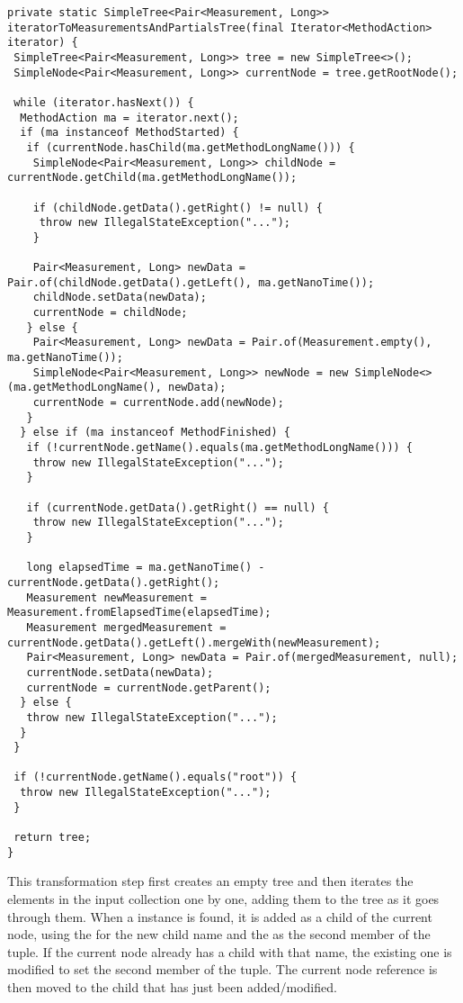 \noindent\begin{minipage}[c]{\linewidth}
\begin{lstlisting}[breaklines,caption={First transformation step},label=lis:timerecorderimplementation:iteratortomeasurementsandpartialstree]
private static SimpleTree<Pair<Measurement, Long>> iteratorToMeasurementsAndPartialsTree(final Iterator<MethodAction> iterator) {
 SimpleTree<Pair<Measurement, Long>> tree = new SimpleTree<>();
 SimpleNode<Pair<Measurement, Long>> currentNode = tree.getRootNode();

 while (iterator.hasNext()) {
  MethodAction ma = iterator.next();
  if (ma instanceof MethodStarted) {
   if (currentNode.hasChild(ma.getMethodLongName())) {
    SimpleNode<Pair<Measurement, Long>> childNode = currentNode.getChild(ma.getMethodLongName());

    if (childNode.getData().getRight() != null) {
     throw new IllegalStateException("...");
    }

    Pair<Measurement, Long> newData = Pair.of(childNode.getData().getLeft(), ma.getNanoTime());
    childNode.setData(newData);
    currentNode = childNode;
   } else {
    Pair<Measurement, Long> newData = Pair.of(Measurement.empty(), ma.getNanoTime());
    SimpleNode<Pair<Measurement, Long>> newNode = new SimpleNode<>(ma.getMethodLongName(), newData);
    currentNode = currentNode.add(newNode);
   }
  } else if (ma instanceof MethodFinished) {
   if (!currentNode.getName().equals(ma.getMethodLongName())) {
    throw new IllegalStateException("...");
   }

   if (currentNode.getData().getRight() == null) {
    throw new IllegalStateException("...");
   }

   long elapsedTime = ma.getNanoTime() - currentNode.getData().getRight();
   Measurement newMeasurement = Measurement.fromElapsedTime(elapsedTime);
   Measurement mergedMeasurement = currentNode.getData().getLeft().mergeWith(newMeasurement);
   Pair<Measurement, Long> newData = Pair.of(mergedMeasurement, null);
   currentNode.setData(newData);
   currentNode = currentNode.getParent();
  } else {
   throw new IllegalStateException("...");
  }
 }

 if (!currentNode.getName().equals("root")) {
  throw new IllegalStateException("...");
 }

 return tree;
}
\end{lstlisting}
\end{minipage}

\noindent This transformation step first creates an empty tree and then iterates the elements in the input collection one by one, adding them to the tree as it goes through them. When a  instance is found, it is added as a child of the current node, using the  for the new child name and the  as the second member of the tuple. If the current node already has a child with that name, the existing one is modified to set the second member of the tuple. The current node reference is then moved to the child that has just been added/modified.

